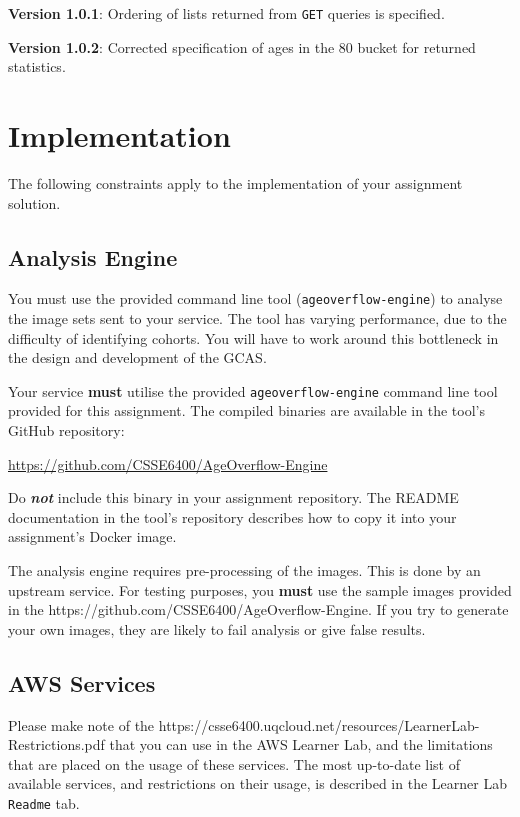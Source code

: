 \documentclass{csse4400}
\begin{document}
\textbf{Version 1.0.1}: Ordering of lists returned from \texttt{GET} queries is specified.

\textbf{Version 1.0.2}: Corrected specification of ages in the 80 bucket for returned statistics.


\section{Implementation}
The following constraints apply to the implementation of your assignment solution.

\subsection{Analysis Engine}
You must use the provided command line tool (\texttt{ageoverflow-engine}) to analyse the image sets sent to your service.
The tool has varying performance, due to the difficulty of identifying cohorts.
You will have to work around this bottleneck in the design and development of the GCAS.

Your service \textbf{must} utilise the provided \texttt{ageoverflow-engine} command line tool provided for this assignment.
The compiled binaries are available in the tool's GitHub repository:

\url{https://github.com/CSSE6400/AgeOverflow-Engine}

\noindent
Do \textbf{\textit{not}} include this binary in your assignment repository.
The README documentation in the tool's repository describes how to copy it into your assignment's Docker image.


The analysis engine requires pre-processing of the images.
This is done by an upstream service.
For testing purposes, you \textbf{must} use the sample images provided in the 
{https://github.com/CSSE6400/AgeOverflow-Engine}.
If you try to generate your own images, they are likely to fail analysis or give false results.

\subsection{AWS Services}
Please make note of the 
{https://csse6400.uqcloud.net/resources/LearnerLab-Restrictions.pdf}
that you can use in the AWS Learner Lab, and the limitations that are placed on the usage of these services.
The most up-to-date list of available services, and restrictions on their usage,
is described in the Learner Lab \texttt{Readme} tab.
\end{document}
